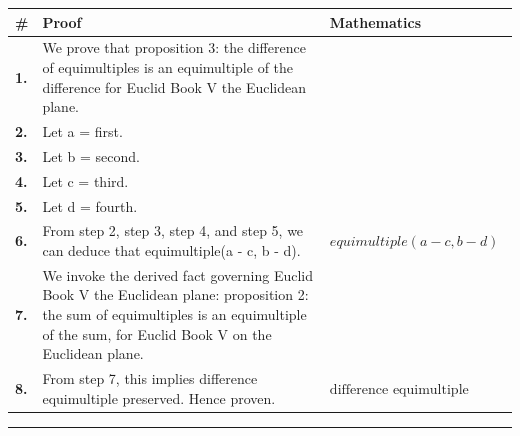 \documentclass[11pt]{article}
\theoremstyle{definition}
\begin{document}
\begin{tabular}{@{} >{\raggedright\arraybackslash}p{} >{\raggedright\arraybackslash}p{} >{\raggedleft\arraybackslash}p{} @{}}
\textbf{\#} & \textbf{Proof} & \textbf{Mathematics} \\
\midrule
\textbf{1.} & We prove that proposition 3: the difference of equimultiples is an equimultiple of the difference for Euclid Book V the Euclidean plane. & \\[0.45em]
\textbf{2.} & Let a = first. & \\[0.45em]
\textbf{3.} & Let b = second. & \\[0.45em]
\textbf{4.} & Let c = third. & \\[0.45em]
\textbf{5.} & Let d = fourth. & \\[0.45em]
\textbf{6.} & From step 2, step 3, step 4, and step 5, we can deduce that equimultiple(a - c, b - d). & $\displaystyle equimultiple(a - c, b - d)$ \\[0.45em]
\textbf{7.} & We invoke the derived fact governing Euclid Book V the Euclidean plane: proposition 2: the sum of equimultiples is an equimultiple of the sum, for Euclid Book V on the Euclidean plane. & \\[0.45em]
\textbf{8.} & From step 7, this implies difference equimultiple preserved. Hence proven. & $\displaystyle \text{difference equimultiple preserved}$ \\[0.45em]
\bottomrule
\end{tabular}
\label{thm:Geometry-Euclid Book V-proposition_3_the_difference_of_equimultiples_is_an_equimultiple_of_the_difference}
\par\medskip\hrule
\end{document}
